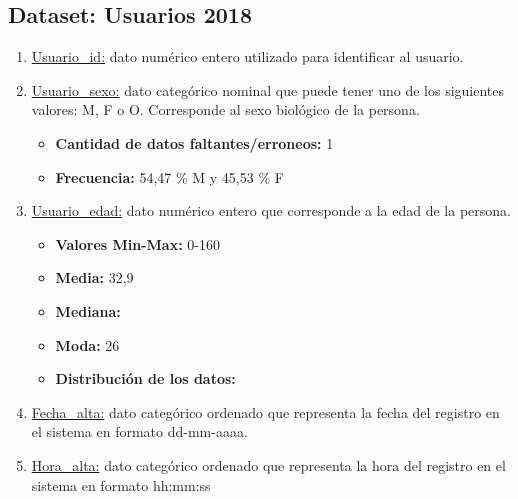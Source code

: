 \subsection{Dataset: Usuarios 2018}
\begin{enumerate}
    \item \underline{Usuario_id:} dato numérico entero utilizado para identificar al usuario.
    \item \underline{Usuario_sexo:} dato categórico nominal que puede tener uno de los siguientes valores: M, F o O. Corresponde al sexo biológico de la persona. 
       \begin{itemize}
            \item \textbf{Cantidad de datos faltantes/erroneos:} 1
            \item \textbf{Frecuencia:} 54,47 \% M y 45,53 \% F
        \end{itemize}
    \item \underline{Usuario_edad:} dato numérico entero que corresponde a la edad de la persona.
        \begin{itemize}
            \item \textbf{Valores Min-Max:} 0-160
            \item \textbf{Media:} 32,9
            \item \textbf{Mediana:}
            \item \textbf{Moda:} 26
            \item \textbf{Distribución de los datos:}
        \end{itemize}
    \item \underline{Fecha_alta:} dato categórico ordenado que representa la fecha del registro en el sistema en formato dd-mm-aaaa.
    \item \underline{Hora_alta:} dato categórico ordenado que representa la hora del registro en el sistema en formato hh:mm:ss
\end{enumerate}